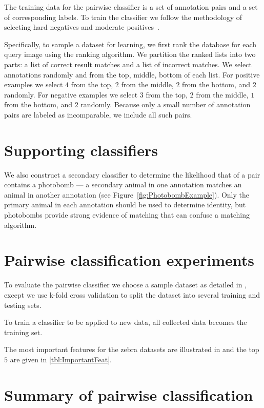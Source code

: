 The training data for the pairwise classifier is a set of annotation pairs and
  a set of corresponding labels.
To train the classifier we follow the methodology of selecting hard negatives
  and moderate positives~\cite{shi_embedding_2016}.

Specifically, to sample a dataset for learning, we first rank the database for
  each query image using the ranking algorithm.
We partition the ranked lists into two parts:
a list of correct result matches and a list of incorrect matches.
We select annotations randomly and from the top, middle, bottom of each list.
For positive examples we select $4$ from the top, $2$ from the middle, $2$
  from the bottom, and $2$ randomly.
For negative examples we select $3$ from the top, $2$ from the middle, $1$
  from the bottom, and $2$ randomly.
Because only a small number of annotation pairs are labeled as incomparable,
  we include all such pairs.

\section{Supporting classifiers}

    We also construct a secondary classifier to determine the likelihood that
      of a pair contains a photobomb --- a secondary animal in one annotation
      matches an animal in another annotation (\eg see
      Figure~\ref{fig:PhotobombExample}).
    Only the primary animal in each annotation should be used to determine
      identity, but photobombs provide strong evidence of matching that can
      confuse a matching algorithm.



\section{Pairwise classification experiments}

To evaluate the pairwise classifier we choose a sample dataset as detailed in
  , except we use k-fold cross validation to split the
  dataset into several training and testing sets.
  
To train a classifier to be applied to new data, all collected data becomes
  the training set.



\WordCloud{}
\ImportantFeat{}

The most important features for the zebra datasets are illustrated in  and the top $5$ are given in \cref{tbl:ImportantFeat}.

\section{Summary of pairwise classification}

